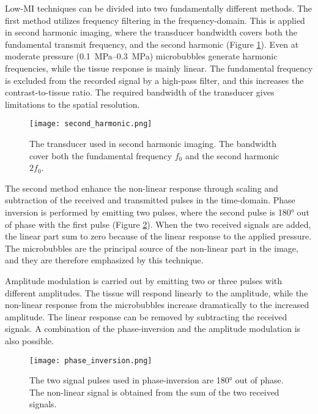 Low-MI techniques can be divided into two fundamentally different methods. The first method utilizes frequency filtering in the frequency-domain. This is applied in second harmonic imaging, where the transducer bandwidth covers both the fundamental transmit frequency, and the second harmonic (Figure \ref{Fig:Second harmonic}). Even at moderate pressure (\SIrange{0.1}{0.3}{\mega\pascal}) microbubbles generate harmonic frequencies, while the tissue response is mainly linear. The fundamental frequency is excluded from the recorded signal by a high-pass filter, and this increases the contrast-to-tissue ratio. The required bandwidth of the transducer gives limitations to the spatial resolution.

\begin{figure}[h]
  \centering
  \texttt{[image: second\_harmonic.png]}
  \caption{The transducer used in second harmonic imaging. The bandwidth cover both the fundamental frequency $f_0$ and the second harmonic $2f_0$\cite{Hoskins2010}.}
  \label{Fig:Second harmonic}
\end{figure}

The second method enhance the non-linear response through scaling and subtraction of the received and transmitted pulses in the time-domain. Phase inversion is performed by emitting two pulses, where the second pulse is \ang{180} out of phase with the first pulse (Figure \ref{Fig:phase inversion}). When the two received signals are added, the linear part sum to zero because of the linear response to the applied pressure. The microbubbles are the principal source of the non-linear part in the image, and they are therefore emphasized by this technique.

Amplitude modulation is carried out by emitting two or three pulses with different amplitudes. The tissue will respond linearly to the amplitude, while the non-linear response from the microbubbles increase dramatically to the increased amplitude. The linear response can be removed by subtracting the received signals. A combination of the phase-inversion and the amplitude modulation is also possible. 

\begin{figure}[h]
  \centering
  \texttt{[image: phase\_inversion.png]}
  \caption{The two signal pulses used in phase-inversion are \ang{180} out of phase. The non-linear signal is obtained from the sum of the two received signals\cite{Hoskins2010}.}
  \label{Fig:phase inversion}
\end{figure}

